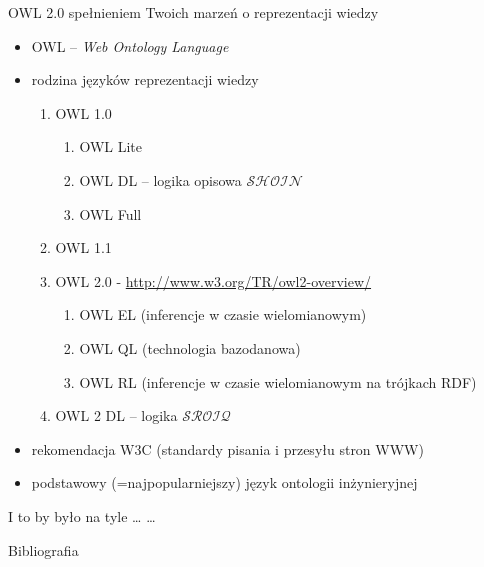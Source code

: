 \documentclass{beamer}
\begin{document}
\begin{frame}{OWL 2.0 spełnieniem Twoich marzeń o reprezentacji wiedzy}
%
\begin{itemize}
\item OWL -- \emph{Web Ontology Language}
%
\item rodzina języków reprezentacji wiedzy
\begin{enumerate}
\item OWL 1.0
\begin{enumerate}
\item OWL Lite
\item OWL DL -- logika opisowa $\mathcal{SHOIN}$
\item OWL Full
\end{enumerate}
%
\item OWL 1.1
%
\item OWL 2.0 - \url{http://www.w3.org/TR/owl2-overview/}
\begin{enumerate}
\item OWL EL (inferencje w czasie wielomianowym)
\item OWL QL (technologia bazodanowa)
\item OWL RL (inferencje w czasie wielomianowym na trójkach RDF)
\end{enumerate}
%
\item OWL 2 DL -- logika $\mathcal{SROIQ}$
%
\end{enumerate}
\item rekomendacja W3C (standardy pisania i przesyłu stron WWW)
%
\item podstawowy (=najpopularniejszy) język ontologii inżynieryjnej
\end{itemize}
\end{frame}




\begin{frame}{I to by było na tyle \dots}
\dots
\end{frame}

\begin{frame}{Bibliografia}
\begin{center}


\end{center}
\end{frame}
\end{document}
